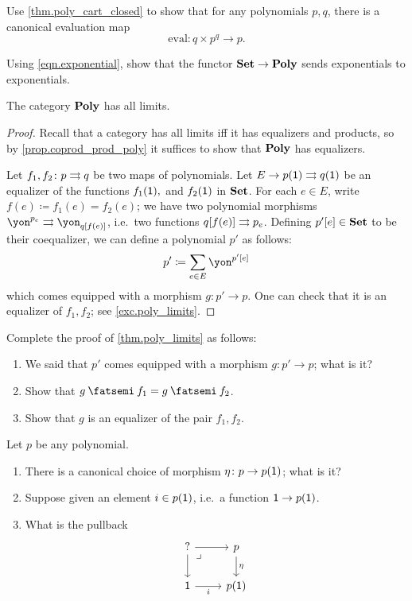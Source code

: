 \documentclass[Book-Poly]{subfiles}
\begin{document}
\begin{exercise}
Use \cref{thm.poly_cart_closed} to show that for any polynomials $p,q$, there is a canonical evaluation map
\begin{equation}\label{eqn.eval_times}
	\text{eval}\colon q\times p^q\to p.
\end{equation}
\end{exercise}


\begin{exercise}
Using \eqref{eqn.exponential}, show that the functor $\mathbf{Set}\to\mathbf{Poly}$ sends exponentials to exponentials.
\end{exercise}

\begin{theorem}\label{thm.poly_limits}
The category $\mathbf{Poly}$ has all limits.
\end{theorem}
\begin{proof}
Recall that a category has all limits iff it has equalizers and products, so by \cref{prop.coprod_prod_poly} it suffices to show that $\mathbf{Poly}$ has equalizers. 

Let $f_1,f_2\colon p\rightrightarrows q$ be two maps of polynomials. Let $E\to p(\textsf{1})\rightrightarrows q(\textsf{1})$ be an equalizer of the functions $f_1(\textsf{1}),$ and $f_2(\textsf{1})$ in $\mathbf{Set}$. For each $e\in E$, write $f(e)\coloneqq f_1(e)=f_2(e)$; we have two polynomial morphisms $\yon^{p_e}\tto\yon_{q[f(e)]}$, i.e.\ two functions $q[f(e)]\rightrightarrows p_e$. Defining $p'[e]\in\mathbf{Set}$ to be their coequalizer, we can define a polynomial $p'$ as follows:
\[
  p'\coloneqq\sum_{e\in E}\yon^{p'[e]}
\]
which comes equipped with a morphism $g\colon p'\to p$. One can check that it is an equalizer of $f_1,f_2$; see \cref{exc.poly_limits}.
\end{proof}

\begin{exercise}\label{exc.poly_limits}
Complete the proof of \cref{thm.poly_limits} as follows:
\begin{enumerate}
	\item We said that $p'$ comes equipped with a morphism $g\colon p'\to p$; what is it?
	\item Show that $g\then f_1=g\then f_2$.
	\item Show that $g$ is an equalizer of the pair $f_1,f_2$.
\qedhere
\end{enumerate}
\end{exercise}

\begin{exercise}
Let $p$ be any polynomial.
\begin{enumerate}
	\item There is a canonical choice of morphism $\eta\colon p\to p(\textsf{1})$; what is it?
	\item Suppose given an element $i\in p(\textsf{1})$, i.e.\ a function $\textsf{1}\to p(\textsf{1})$.
	\item What is the pullback
	\[
	\begin{tikzcd}
	?\ar[r]\ar[d]&
	p\ar[d, "\eta"]\\
	\1\ar[r, "i"']&
	p(\1)\ar[ul, phantom, very near end, "\lrcorner"]
	\end{tikzcd}
	\qedhere
	\]
\end{enumerate}
\end{exercise}
\end{document}
